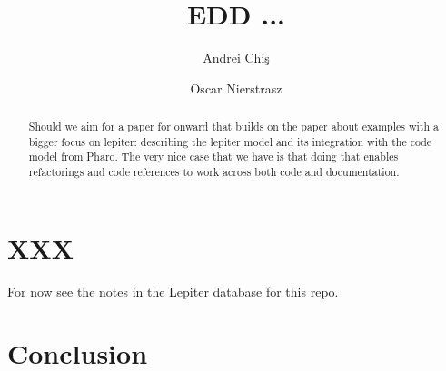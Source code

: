 \documentclass[acmsmall,screen,authorversion,nonacm]{acmart} %
\begin{document}
\title[Example-driven development ...]{EDD ...}%


\author{Andrei Chi\c{s}}

\author{Oscar Nierstrasz}



\begin{abstract}
Should we aim for a paper for onward that builds on the paper about examples with a bigger focus on lepiter: describing the lepiter model and its integration with the code model from Pharo. The very nice case that we have is that doing that enables refactorings and code references to work across both code and documentation.
\end{abstract}



\maketitle

\section{XXX}\label{sec:xxx}

For now see the notes in the Lepiter database for this repo.

\section{Conclusion}\label{sec:conclusion}







\end{document}
